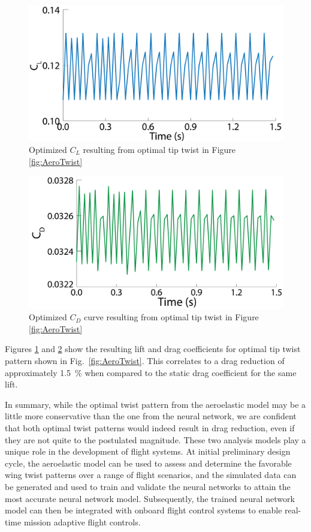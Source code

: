 \documentclass[11pt]{ucthesis}
\begin{document}
\begin{figure}[h!]
\centering
\includegraphics[width=1\linewidth]{./Figures/AeroCLOpt-01.png}
\caption{Optimized $C_L$ resulting from optimal tip twist in Figure \ref{fig:AeroTwist}}
\label{fig:AeroCL}
\end{figure}

\begin{figure}[h!]
\centering
\includegraphics[width=1\linewidth]{./Figures/OptimalAeroCD-01.png}
\caption{Optimized $C_D$ curve resulting from optimal tip twist in Figure \ref{fig:AeroTwist}}
\label{fig:AeroCD}
\end{figure}

Figures \ref{fig:AeroCL} and \ref{fig:AeroCD} show the resulting lift and drag coefficients for optimal tip twist pattern shown in Fig.~\ref{fig:AeroTwist}. This correlates to a drag reduction of approximately 1.5~\% when compared to the static drag coefficient for the same lift.

In summary, while the optimal twist pattern from the aeroelastic model may be a little more conservative than the one from the neural network, we are confident that both optimal twist patterns would indeed result in drag reduction, even if they are not quite to the postulated magnitude. These two analysis models play a unique role in the development of flight systems. At initial preliminary design cycle, the aeroelastic model can be used to assess and determine the favorable wing twist patterns over a range of flight scenarios, and the simulated data can be generated and used to train and validate the neural networks to attain the most accurate neural network model. Subsequently, the trained neural network model can then be integrated with onboard flight control systems to enable real-time mission adaptive flight controls.  
\end{document}
